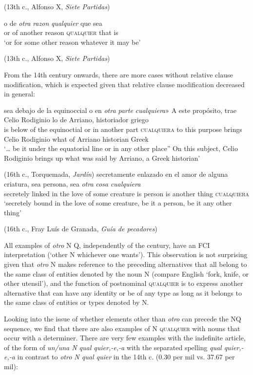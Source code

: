     (13th c., Alfonso X, \textit{Siete Partidas})
    
\ex \label{ex:key:292-3} 
\gll o de \textit{otra} \textit{razon} \textit{qualquier} que sea\\
or of another reason \textsc{qualquier} that is\\
    \glt ‘or for some other reason whatever it may be’

    (13th c., Alfonso X, \textit{Siete Partidas})
\z
\z

From the 14th century onwards, there are more cases without relative clause modification, which is expected given that relative clause modification decreased in general:

\ea \label{ex:key:293}
\ea{} \label{ex:key:293-1} 
\gll […] sea debajo de la equinoccial o en \textit{otra} \textit{parte} \textit{cualquiera}» A este propósito, trae Celio Rodiginio lo de Arriano, historiador griego\\
{} is below of the equinoctial or in another part \textsc{cualquiera} to this purpose brings Celio Rodiginio what of Arriano historian Greek\\
    \glt ‘… be it under the equatorial line or in any other place” On this subject, Celio Rodiginio brings up what was said by Arriano, a Greek historian’

    (16th c., Torquemada, \textit{Jardín})
\ex \label{ex:key:293-2} 
\gll secretamente enlazado en el amor de alguna criatura, sea persona, sea \textit{otra} \textit{cosa} \textit{cualquiera}\\
secretely linked in the love of some creature is person is another thing \textsc{cualquiera}\\ 
    \glt ‘secretely bound in the love of some creature, be it a person, be it any other thing’

    (16th c., Fray Luís de Granada, \textit{Guía de pecadores})
\z
\z

All examples of \textit{otro} N Q, independently of the century, have an FCI interpretation (‘other N whichever one wants’). This observation is not surprising given that \textit{otro} N makes reference to the preceding alternatives that all belong to the same class of entities denoted by the noun N (compare English ‘fork, knife, or other utensil’), and the function of postnominal \textsc{qualquier} is to express another alternative that can have any identity or be of any type as long as it belongs to the same class of entities or types denoted by N.

Looking into the issue of whether elements other than \textit{otro} can precede the NQ sequence, we find that there are also examples of N \textsc{qualquier} with nouns that occur with a determiner. There are very few examples with the indefinite article, of the form of \textit{un/una N qual quier,-e,-a} with the separated spelling \textit{qual quier,-e,-a} in contrast to \textit{otro N qual quier} in the 14th c. (0.30 per mil vs. 37.67 per mil):

